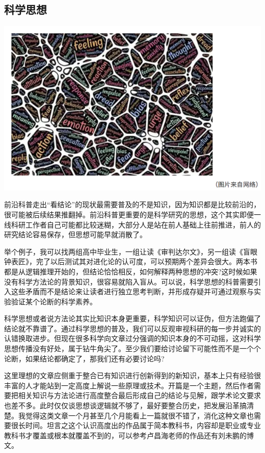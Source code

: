 \documentclass[]{book}
\begin{document}
\subsection{科学思想}

\includegraphics[width=8.33in]{images/pops6}

前沿科普走出``看结论''的现状最需要普及的不是知识，因为知识都是比较前沿的，很可能被后续结果推翻掉。前沿科普更重要的是科学研究的思想，这个其实即便一线科研工作者自己可能都比较迷糊，大部分人是站在前人基础上往前推进，前人的研究结论容易保存，但思想可能早就消散了。

举个例子，我可以找两组高中毕业生，一组让读《审判达尔文》，另一组读《盲眼钟表匠》，完了以后测试其对进化论的认可度，可以预期两个差异会很大。两本书都是从逻辑推理开始的，但结论恰恰相反，如何解释两种思想的冲突?这时候如果没有科学方法论的背景知识，很容易就陷入盲从。可以说，科学思想的科普需要引入这些矛盾而不是结论来让读者进行独立思考判断，并形成存疑并可通过观察与实验验证某个论断的科学素养。

科学思想或者说方法论其实比知识本身更重要，科学知识可以证伪，但方法跑偏了结论就不靠谱了。通过科学思想的普及，我们可以反观审视科研的每一步并诚实的认错换取进步。但现在很多科学向文章过分强调的知识本身的不可动摇，这对科学思想传播没有好处，属于钻牛角尖了。至少我们要给讨论留下可能性而不是一个个论断，如果结论都确定了，那我们还有必要讨论吗?

这里理想的文章应侧重于整合已有知识进行创新得到的新知识，基本上只有经验很丰富的人才能站到一定高度上解说一些原理或技术。开篇是一个主题，然后作者需要把相关知识与方法论进行高度整合最后形成自己的结论与见解，跟学术论文要求也差不多。此时仅仅谈思想谈逻辑就不够了，最好要整合历史，把发展沿革搞清楚。我觉得这类文章一个月甚至几个月能看上一篇就很不错了，消化这种文章也需要很长时间。坦言之这个认识高度出的作品属于简本教科书，内容却是职业或专业教科书才覆盖或根本就覆盖不到的，可以参考卢昌海老师的作品还有刘未鹏的博文。
\end{document}
